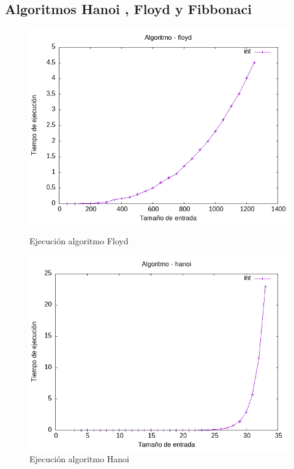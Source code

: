 \documentclass[11pt]{article}
\begin{document}
    \subsection{Algoritmos Hanoi , Floyd y Fibbonaci}
    \begin{figure}[H]
        \begin{minipage}{0.5\textwidth}
            \centering
            \includegraphics[width=\linewidth]{assets/Img/floydint.png}
            \caption{Ejecución algoritmo Floyd}
            \label{fig:floyd}
        \end{minipage}
        \begin{minipage}{0.5\textwidth}
            \centering
            \includegraphics[width=\linewidth]{assets/Img/hanoiint.png}
            \caption{Ejecución algoritmo Hanoi}
            \label{fig:hanoi}
        \end{minipage}
    \end{figure}
\end{document}
